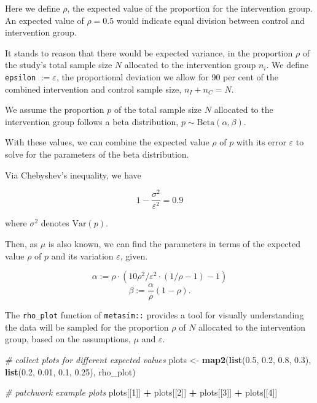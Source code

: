 \documentclass[]{article}
\newenvironment{Shaded}{\begin{snugshade}}{\end{snugshade}}
\newcommand{\CommentTok}[1]{\textcolor[rgb]{0.56,0.35,0.01}{\textit{#1}}}
\newcommand{\DecValTok}[1]{\textcolor[rgb]{0.00,0.00,0.81}{#1}}
\newcommand{\FloatTok}[1]{\textcolor[rgb]{0.00,0.00,0.81}{#1}}
\newcommand{\KeywordTok}[1]{\textcolor[rgb]{0.13,0.29,0.53}{\textbf{#1}}}
\newcommand{\NormalTok}[1]{#1}
\newcommand{\OperatorTok}[1]{\textcolor[rgb]{0.81,0.36,0.00}{\textbf{#1}}}
\newcommand{\StringTok}[1]{\textcolor[rgb]{0.31,0.60,0.02}{#1}}
\begin{document}
Here we define \(\rho\), the expected value of the proportion for the
intervention group. An expected value of \(\rho = 0.5\) would indicate
equal division between control and intervention group.

It stands to reason that there would be expected variance, in the
proportion \(\rho\) of the study's total sample size \(N\) allocated to
the intervention group \(n_i\). We define \texttt{epsilon}
\(:= \varepsilon\), the proportional deviation we allow for 90 per cent
of the combined intervention and control sample size, \(n_I + n_C = N\).

We assume the proportion \(p\) of the total sample size \(N\) allocated
to the intervention group follows a beta distribution,
\(p \sim \mathrm{Beta}(\alpha, \beta)\).

With these values, we can combine the expected value \(\rho\) of \(p\)
with its error \(\varepsilon\) to solve for the parameters of the beta
distribution.

Via Chebyshev's inequality, we have

\[
1 - \frac{\sigma^2}{\varepsilon^2} = 0.9
\]

where \(\sigma^2\) denotes \(\mathrm{Var}(p)\).

Then, as \(\mu\) is also known, we can find the parameters in terms of
the expected value \(\rho\) of \(p\) and its variation \(\varepsilon\),
given.

\[
\alpha := \rho \cdot (10\rho^2/\varepsilon^2 \cdot (1/\rho - 1) - 1)
\] \[
\beta := \frac \alpha \rho (1 - \rho).
\]

The \texttt{rho\_plot} function of \texttt{metasim::} provides a tool
for visually understanding the data will be sampled for the proportion
\(\rho\) of \(N\) allocated to the intervention group, based on the
assumptions, \(\mu\) and \(\varepsilon\).

\begin{Shaded}
\begin{Highlighting}[]
\CommentTok{# collect plots for different expected values}
\NormalTok{plots <-}\StringTok{ }\KeywordTok{map2}\NormalTok{(}\KeywordTok{list}\NormalTok{(}\FloatTok{0.5}\NormalTok{, }\FloatTok{0.2}\NormalTok{, }\FloatTok{0.8}\NormalTok{, }\FloatTok{0.3}\NormalTok{), }\KeywordTok{list}\NormalTok{(}\FloatTok{0.2}\NormalTok{, }\FloatTok{0.01}\NormalTok{, }\FloatTok{0.1}\NormalTok{, }\FloatTok{0.25}\NormalTok{), rho_plot)}

\CommentTok{# patchwork example plots}
\NormalTok{plots[[}\DecValTok{1}\NormalTok{]] }\OperatorTok{+}\StringTok{ }\NormalTok{plots[[}\DecValTok{2}\NormalTok{]] }\OperatorTok{+}\StringTok{ }\NormalTok{plots[[}\DecValTok{3}\NormalTok{]] }\OperatorTok{+}\StringTok{ }\NormalTok{plots[[}\DecValTok{4}\NormalTok{]]}
\end{Highlighting}
\end{Shaded}
\end{document}
